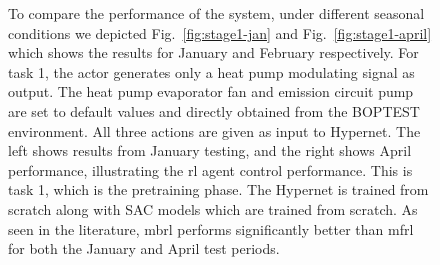 \documentclass{article}
\begin{document}
\begin{figure}[H]
    \vspace{0.5em} %
  \begin{minipage}[t]{\textwidth}
    \small
    To compare the performance of the system, under different seasonal conditions we depicted Fig.~\ref{fig:stage1-jan} and Fig.~\ref{fig:stage1-april}  which shows the results for January and February respectively.
    For task 1, the actor generates only a heat pump modulating signal as output. The heat pump evaporator fan and emission circuit pump are set to default values and directly obtained from the BOPTEST environment. All three actions are given as input to Hypernet. 
    The left shows results from January testing, and the right shows April performance, illustrating the \gls{rl} agent control performance. This is task 1, which is the pretraining phase. The Hypernet is trained from scratch along with SAC models which are trained from scratch.
    As seen in the literature, \gls{mbrl} performs significantly better than \gls{mfrl} for both the January and April test periods.
    
  \end{minipage}

\end{figure}
\end{document}
